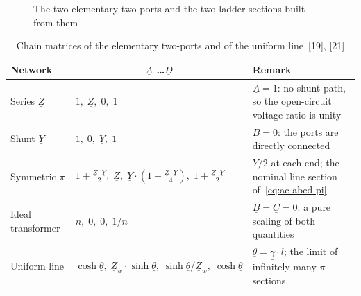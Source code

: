 \begin{figure}[!ht]
  \caption{The two elementary two-ports and the two ladder sections built
           from them}
  \label{fig:tp-elements}
\end{figure}

\begin{table}[!ht]
  \centering
  \begin{tabularx}{\linewidth}{@{}l l X@{}}
    \toprule
    \textbf{Network} & \multicolumn{1}{c}{$\underline{A}$ \ldots $\underline{D}$}
      & \textbf{Remark} \\
    \midrule
    Series $\underline{Z}$
      & $1,\; \underline{Z},\; 0,\; 1$
      & $\underline{A} = 1$: no shunt path, so the open-circuit voltage
        ratio is unity \\
    Shunt $\underline{Y}$
      & $1,\; 0,\; \underline{Y},\; 1$
      & $\underline{B} = 0$: the ports are directly connected \\
    Symmetric $\pi$
      & $1 + \frac{\underline{Z} \cdot \underline{Y}}{2},\;
         \underline{Z},\;
         \underline{Y} \cdot \left(1 + \frac{\underline{Z} \cdot
         \underline{Y}}{4}\right),\;
         1 + \frac{\underline{Z} \cdot \underline{Y}}{2}$
      & $\underline{Y}/2$ at each end; the nominal line section
        of~\eqref{eq:ac-abcd-pi} \\
    Ideal transformer
      & $n,\; 0,\; 0,\; 1/n$
      & $\underline{B} = \underline{C} = 0$: a pure scaling of both
        quantities \\
    Uniform line
      & $\cosh \underline{\theta},\;
         \underline{Z}_w \cdot \sinh \underline{\theta},\;
         \sinh \underline{\theta} / \underline{Z}_w,\;
         \cosh \underline{\theta}$
      & $\underline{\theta} = \underline{\gamma} \cdot l$; the limit of
        infinitely many $\pi$-sections \\
    \bottomrule
  \end{tabularx}
  \caption{Chain matrices of the elementary two-ports and of the uniform
           line~[19], [21]}
  \label{tab:tp-matrices}
\end{table}

